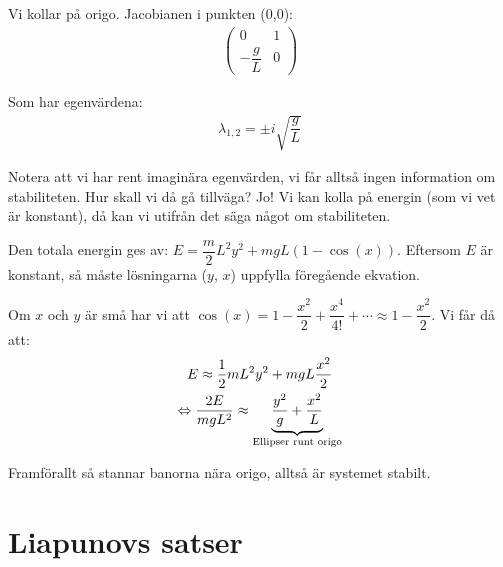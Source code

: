 \noindent Vi kollar på origo. Jacobianen i punkten (0,0):
\begin{equation*}
  \begin{gathered}
    \begin{pmatrix}0&1\\-\dfrac{g}{L}&0\end{pmatrix}
  \end{gathered}
\end{equation*}\par
\noindent Som har egenvärdena:
\begin{equation*}
  \begin{gathered}
    \lambda_{1,2}=\pm i\sqrt{\dfrac{g}{L}}
  \end{gathered}
\end{equation*}\par\bigskip
\noindent Notera att vi har rent imaginära egenvärden, vi får alltså ingen information om stabiliteten. Hur skall vi då gå tillväga? Jo! Vi kan kolla på energin (som vi vet är konstant), då kan vi utifrån det säga något om stabiliteten.
\par\bigskip
\noindent Den totala energin ges av: $E=\dfrac{m}{2}L^2y^2+mgL(1-\cos(x))$. Eftersom $E$ är konstant, så måste lösningarna ($y$, $x$) uppfylla föregående ekvation.
\par
\noindent Om $x$ och $y$ är små har vi att $\cos(x)=1-\dfrac{x^2}{2}+\dfrac{x^4}{4!}+\cdots\approx 1-\dfrac{x^2}{2}$. Vi får då att:
\begin{equation*}
  \begin{gathered}
    E\approx\dfrac{1}{2}mL^2y^2+mgL\dfrac{x^2}{2}\\
    \Leftrightarrow \dfrac{2E}{mgL^2}\approx \underbrace{\dfrac{y^2}{g}+\dfrac{x^2}{L}
}_{\text{Ellipser runt origo}}
  \end{gathered}
\end{equation*}\par
\noindent Framförallt så stannar banorna nära origo, alltså är systemet stabilt.
\par\bigskip
\section{Liapunovs satser}\hfill\\
\par\bigskip
